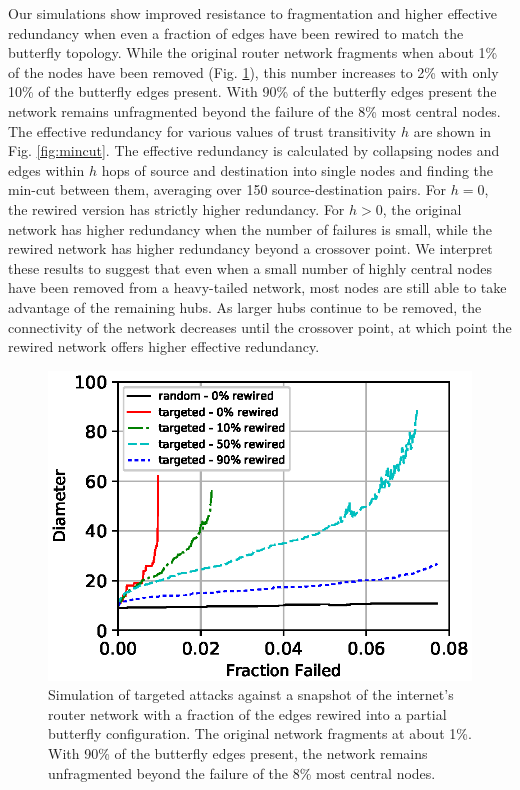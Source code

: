 \documentclass[10pt,letterpaper]{article}
\begin{document}
Our simulations show improved resistance to fragmentation and higher
effective redundancy when even a fraction of edges have been rewired to
match the butterfly topology.
While the original router network fragments when about 1\% of the nodes
have been removed (Fig. \ref{fig:diameter}),
this number increases to 2\%
with only 10\% of the butterfly edges present.
With 90\% of the butterfly edges present
the network remains unfragmented beyond the failure of the 8\% most
central nodes.
The effective redundancy for various values of trust transitivity $h$
are shown in Fig. \ref{fig:mincut}.
The effective redundancy is calculated by collapsing nodes and edges within
$h$ hops of source and destination into single nodes and finding the min-cut
between them,
averaging over 150 source-destination pairs.
For $h=0$, the rewired version has strictly higher redundancy.
For $h>0$,
the original network has higher redundancy when the number of failures is small,
while the rewired network has higher redundancy beyond a crossover point.
We interpret these results to suggest that even when a small number of
highly central nodes have been removed from a heavy-tailed network,
most nodes are still able to take advantage of the remaining hubs.
As larger hubs continue to be removed, the connectivity of the network
decreases until the crossover point,
at which point the rewired network offers higher effective redundancy.

\begin{figure}
\centerline{\includegraphics{fig-diameter}}
\caption{
Simulation of targeted attacks against a snapshot of the internet's router
network with a fraction of the edges rewired into a partial butterfly configuration.
The original network fragments at about 1\%.
With 90\% of the butterfly edges present,
the network remains unfragmented beyond the failure of the 8\% most
central nodes.
}
\label{fig:diameter}
\end{figure}
\end{document}
